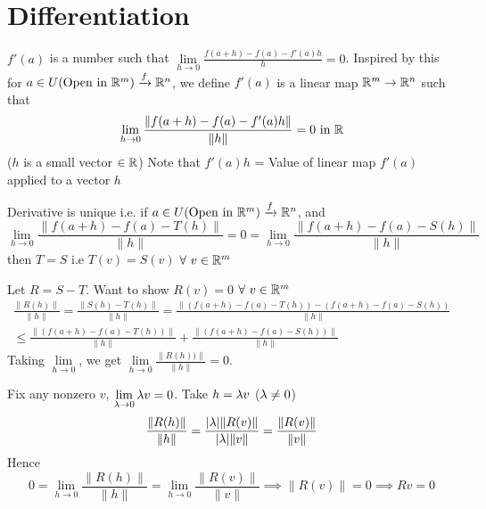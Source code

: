 \section{Differentiation}
$f'(a)$ is a number such that $\lim\limits_{h\to 0}\frac{f(a+h)-f(a)-f'(a)h}{h}=0$. Inspired by this for $a\in U (\text{Open in }\mathbb{R}^m)\xrightarrow{f}\mathbb{R}^n$, we define $f'(a)$ is a linear map $\mathbb{R}^m\to\mathbb{R}^n$ such that $$\lim\limits_{h\to 0}\frac{\|f(a+h)-f(a)-f'(a)h\|}{\|h\|}=0\text{ in }\mathbb{R} $$($h$ is a small vector $\in\mathbb{R}$)
Note that $f'(a)h$ = Value of linear map $f'(a)$ applied to a vector $h$
\begin{Theorem}{}{}
	Derivative is unique i.e. if $a\in U (\text{Open in }\mathbb{R}^m)\xrightarrow{f}\mathbb{R}^n$,  and $$\lim_{h\to 0}\frac{\|f(a+h)-f(a)-T(h)\|}{\|h\|}=0 =\lim_{h\to 0}\frac{\|f(a+h)-f(a)-S(h)\|}{\|h\|}$$then $T=S$ i.e $T(v)=S(v)$ $\forall\ v\in\mathbb{R}^m$
\end{Theorem}
\begin{myproof}
	Let $R=S-T$. Want to show $R(v)=0$ $\forall \ v\in\mathbb{R}^m$ \begin{multline*}
		\frac{\|R(h)\|}{\|h\|}=\frac{\|S(h)-T(h)\|}{\|h\|}=\frac{\|(f(a+h)-f(a)-T(h))-(f(a+h)-f(a)-S(h))}{\|h\|} \\
		\leq \frac{\|(f(a+h)-f(a)-T(h))\|}{\|h\|}+\frac{\|(f(a+h)-f(a)-S(h))\|}{\|h\|}
	\end{multline*}Taking $\lim\limits_{h\to 0}$, we get $\lim\limits_{h\to 0}\frac{\|R(h))\|}{\|h\|}=0$.

	Fix any nonzero $v$, $\lim\limits_{\lambda\to 0}\lambda v=0$. Take $h=\lambda v$ ($\lambda\neq 0$)$$\frac{\|R(h)\|}{\|h\|}=\frac{|\lambda|\|R(v)\|}{|\lambda|\|v\|}=\frac{\|R(v)\|}{\|v\|}$$Hence $$0=\lim\limits_{h\to 0}\frac{\|R(h)\|}{\|h\|}=\lim_{h\to 0}\frac{\|R(v)\|}{\|v\|}\implies\|R(v)\|=0\implies Rv=0$$
\end{myproof}
